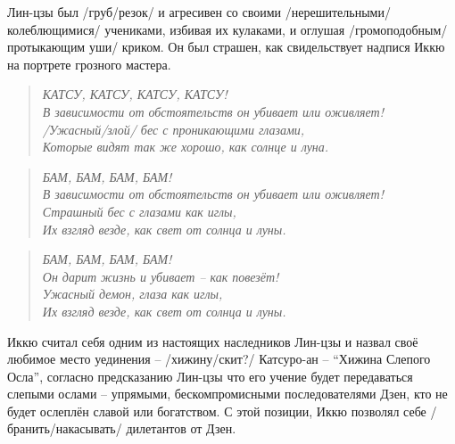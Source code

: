 \begin{ver}
Лин-цзы был /груб/резок/ и агресивен со своими
/нерешительными/колеблющимися/ учениками, избивая их кулаками, и
оглушая /громоподобным/протыкающим уши/ криком. Он был
страшен, как свидельствует надпися Иккю на
портрете  грозного мастера. 
\end{ver}

\begin{ver}
  \begin{verse}\it
    КАТСУ, КАТСУ, КАТСУ, КАТСУ!\\
    В зависимости от обстоятельств он убивает или оживляет!\\
    /Ужасный/злой/ бес с проникающими глазами,\\
    Которые видят так же хорошо, как солнце и луна.
  \end{verse}
\end{ver}

\begin{ver}[1]
  \begin{verse}\it
    БАМ, БАМ, БАМ, БАМ!\\
    В зависимости от обстоятельств он убивает или оживляет!\\
    Страшный бес с глазами как иглы,\\
    Их взгляд везде, как свет от солнца и луны.
  \end{verse}
\end{ver}

\begin{ver}[1]
  \begin{verse}\it
    БАМ, БАМ, БАМ, БАМ!\\
    Он дарит жизнь и убивает -- как повезёт!\\
    Ужасный демон, глаза как иглы,\\
    Их взгляд везде, как свет от солнца и луны.
  \end{verse}
\end{ver}

\begin{ver}
  Иккю считал себя одним из настоящих наследников Лин-цзы и назвал
  своё любимое место уединения -- /хижину/скит?/ Катсуро-ан --
  ``Хижина Слепого Осла'', согласно предсказанию Лин-цзы что его
  учение будет передаваться слепыми ослами -- упрямыми,
  бескомпромисными последователями Дзен, кто не будет ослеплён славой
  или богатством. С этой позиции, Иккю позволял себе
  /бранить/накасывать/ дилетантов от Дзен.
\end{ver}

